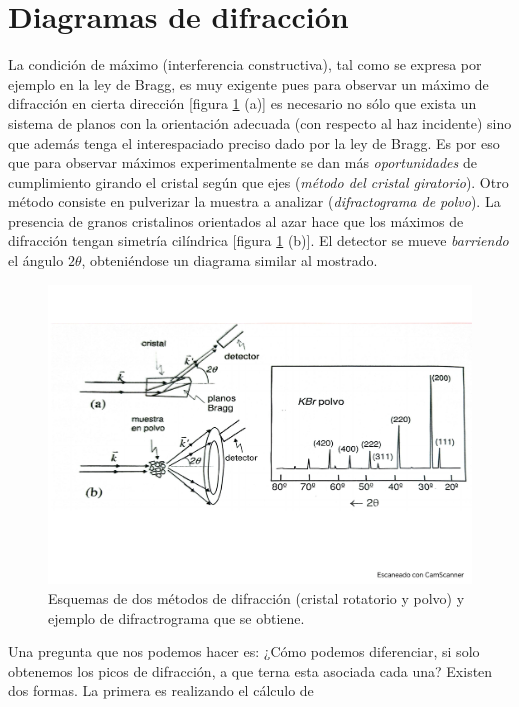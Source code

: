 \section{Diagramas de difracción}

La condición de máximo (interferencia constructiva), tal como se expresa por ejemplo en la ley de Bragg, es muy exigente pues para observar un máximo de difracción en cierta dirección [figura \ref{Fig:02-08} (a)] es necesario no sólo que exista un sistema de planos con la orientación adecuada (con respecto al haz incidente) sino que además tenga el interespaciado preciso dado por la ley de Bragg. Es por eso que para observar máximos experimentalmente se dan más \textit{oportunidades} de cumplimiento girando el cristal según que ejes (\textit{método del cristal giratorio}). Otro método consiste en pulverizar la muestra a analizar (\textit{difractograma de polvo}). La presencia de granos cristalinos orientados al azar hace que los máximos de difracción tengan simetría cilíndrica [figura \ref{Fig:02-08} (b)]. El detector se mueve \textit{barriendo} el ángulo $2\theta$, obteniéndose un diagrama similar al mostrado. 

    
\begin{figure}[h!] \centering
    \includegraphics[scale=0.35]{Cuerpo/Ch_02/Fotos_libro 8.pdf}
    \caption{Esquemas de dos métodos de difracción (cristal rotatorio y polvo) y ejemplo de difractrograma que se obtiene.}
    \label{Fig:02-08}
\end{figure}

Una pregunta que nos podemos hacer es: ¿Cómo podemos diferenciar, si solo obtenemos los picos de difracción, a que terna esta asociada cada una? Existen dos formas. La primera es realizando el cálculo de 

